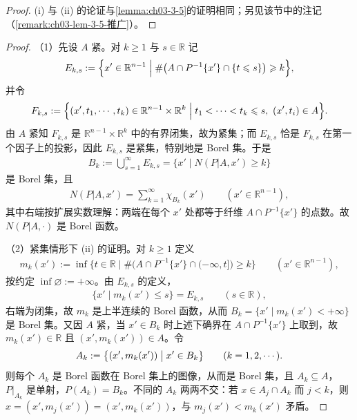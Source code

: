 \documentclass[../../main.tex]{subfiles}%
\begin{document}
\begin{proof}
(i) 与 (ii) 的论证与\cref{lemma:ch03-3-5}的证明相同；另见该节中的注记（\cref{remark:ch03-lem-3-5-推广}）。%
\end{proof}
\begin{proof}
（1）先设 $A$ 紧。对 $k\geqslant1$ 与 $s\in\mathbb{R}$ 记
\begin{align*}
E_{k,s}:=\Bigl\{x'\in\mathbb{R}^{n-1}\Bigm|\#\bigl(A\cap P^{-1}\{x'\}\cap\{t\leqslant s\}\bigr)\geqslant k\Bigr\},
\end{align*}
并令
\begin{align*}
F_{k,s}:=\Bigl\{(x',t_1,\cdots,t_k)\in\mathbb{R}^{n-1}\times\mathbb{R}^k\Bigm|t_1<\cdots<t_k\leqslant s,\ (x',t_i)\in A\Bigr\}.
\end{align*}
由 $A$ 紧知 $F_{k,s}$ 是 $\mathbb{R}^{n-1}\times\mathbb{R}^k$ 中的有界闭集，故为紧集；而 $E_{k,s}$ 恰是 $F_{k,s}$ 在第一个因子上的投影，因此 $E_{k,s}$ 是紧集，特别地是 Borel 集。于是
\begin{align*}
B_k:=\bigcup_{s=1}^{\infty}E_{k,s}=\bigl\{x'\mid N(P|A,x')\geqslant k\bigr\}
\end{align*}
是 Borel 集，且
\begin{align*}
N(P|A,x')=\sum_{k=1}^{\infty}\chi_{B_k}(x')\qquad(x'\in\mathbb{R}^{n-1}),
\end{align*}
其中右端按扩展实数理解：两端在每个 $x'$ 处都等于纤维 $A\cap P^{-1}\{x'\}$ 的点数。故 $N(P|A,\cdot)$ 是 Borel 函数。

（2）紧集情形下 (ii) 的证明。对 $k\geqslant1$ 定义
\begin{align*}
m_k(x'):=\inf\bigl\{t\in\mathbb{R}\mid\#\bigl(A\cap P^{-1}\{x'\}\cap(-\infty,t]\bigr)\geqslant k\bigr\}\qquad(x'\in\mathbb{R}^{n-1}),
\end{align*}
按约定 $\inf\varnothing:=+\infty$。由 $E_{k,s}$ 的定义，
\begin{align*}
\{x'\mid m_k(x')\leqslant s\}=E_{k,s}\qquad(s\in\mathbb{R}),
\end{align*}
右端为闭集，故 $m_k$ 是上半连续的 Borel 函数，从而 $B_k=\{x'\mid m_k(x')<+\infty\}$ 是 Borel 集。又因 $A$ 紧，当 $x'\in B_k$ 时上述下确界在 $A\cap P^{-1}\{x'\}$ 上取到，故 $m_k(x')\in\mathbb{R}$ 且 $(x',m_k(x'))\in A$。令
\begin{align*}
A_k:=\bigl\{(x',m_k(x'))\bigm|x'\in B_k\bigr\}\qquad(k=1,2,\cdots).
\end{align*}
则每个 $A_k$ 是 Borel 函数在 Borel 集上的图像，从而是 Borel 集，且 $A_k\subseteq A$，$P|_{A_k}$ 是单射，$P(A_k)=B_k$。不同的 $A_k$ 两两不交：若 $x\in A_j\cap A_k$ 而 $j<k$，则 $x=(x',m_j(x'))=(x',m_k(x'))$，与 $m_j(x')<m_k(x')$ 矛盾。


\end{proof}
\end{document}
